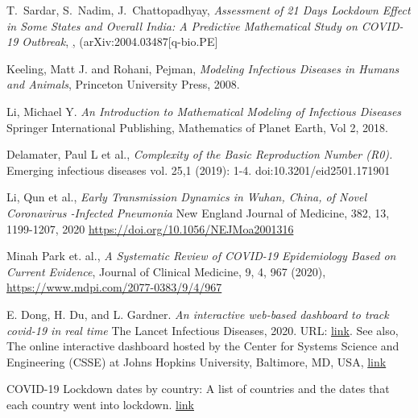 \documentclass[aps,prd,10pt,twocolumn,nofootinbib]{revtex4-2}
\begin{document}
\begin{thebibliography}{99}
T.~Sardar, S.~Nadim, J.~Chattopadhyay, {\it Assessment of 21 Days Lockdown Effect in Some States and Overall India: A Predictive Mathematical Study on COVID-19 Outbreak}, \href{https://arxiv.org/abs/2004.03487}, {(arXiv:2004.03487[q-bio.PE]}



Keeling, Matt J. and Rohani, Pejman,
{\it Modeling Infectious Diseases in Humans and Animals},
Princeton University Press, 2008.



Li, Michael Y.
{\it An Introduction to Mathematical Modeling of Infectious Diseases}
Springer International Publishing, Mathematics of Planet Earth, Vol 2, 2018.

Delamater, Paul L et al.,
{\it Complexity of the Basic Reproduction Number (R0).}
Emerging infectious diseases vol. 25,1 (2019): 1-4. doi:10.3201/eid2501.171901


Li, Qun et al.,
{\it Early Transmission Dynamics in Wuhan, China, of Novel Coronavirus -Infected Pneumonia}
New England Journal of Medicine, 382, 13, 1199-1207, 2020
\href{https://doi.org/10.1056/NEJMoa2001316}{https://doi.org/10.1056/NEJMoa2001316}

Minah Park et. al.,
{\it A Systematic Review of COVID-19 Epidemiology Based on Current Evidence},
Journal of Clinical Medicine, 9, 4, 967 (2020), 
\href{https://www.mdpi.com/2077-0383/9/4/967}{https://www.mdpi.com/2077-0383/9/4/967}


E. Dong, H. Du, and L. Gardner. 
{\it An interactive web-based dashboard to track covid-19 in real time} The Lancet Infectious Diseases, 2020. URL: \href{https://linkinghub.elsevier.com/retrieve/pii/S1473309920301201}{link}. See also,
The online interactive dashboard hosted by the Center for Systems Science and Engineering (CSSE) at Johns Hopkins University, Baltimore, MD, USA,
\href{https://github.com/CSSEGISandData/COVID-19/tree/master/csse_covid_19_data}{link}


COVID-19 Lockdown dates by country: A list of countries and the dates that each country went into lockdown.
\href{https://www.kaggle.com/jcyzag/covid19-lockdown-dates-by-country/version/3}{link}



\end{thebibliography}
\end{document}
